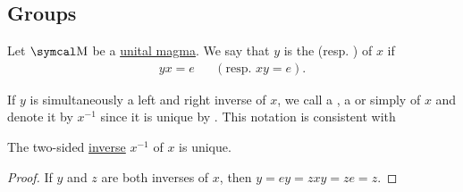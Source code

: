 \subsection{Groups}\label{subsec:groups}

\begin{definition}\label{def:unital_magma_inverse_element}
  Let \( \CM \) be a \hyperref[def:unital_magma]{unital magma}. We say that \( y \) is the  (resp. ) of \( x \) if
  \begin{align}\label{eq:def:unital_magma_inverse_element}
    yx = e
    &&
    (\text{resp. } xy = e).
  \end{align}

  If \( y \) is simultaneously a left and right inverse of \( x \), we call a , a  or simply  of \( x \) and denote it by \( x^{-1} \) since it is unique by . This notation is consistent with 
\end{definition}

\begin{proposition}\label{def:unital_magma_inverse_element_unique}
  The two-sided \hyperref[def:unital_magma_inverse_element]{inverse} \( x^{-1} \) of \( x \) is unique.
\end{proposition}
\begin{proof}
  If \( y \) and \( z \) are both inverses of \( x \), then \( y = ey = zxy = ze = z \).
\end{proof}

